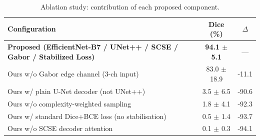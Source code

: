 \begin{table}[t]
\centering
\caption{Ablation study: contribution of each proposed component.}
\label{tab:ablation}
\begin{tabular}{lcc}
\toprule
Configuration & Dice (\%) & $\Delta$ \\
\midrule
\textbf{Proposed (EfficientNet-B7 / UNet++ / SCSE / Gabor / Stabilized Loss)} & \textbf{94.1 $\pm$ 5.1} & --- \\
Ours w/o Gabor edge channel (3-ch input) & 83.0 $\pm$ 18.9 & -11.1 \\
Ours w/ plain U-Net decoder (not UNet++) & 3.5 $\pm$ 6.5 & -90.6 \\
Ours w/o complexity-weighted sampling & 1.8 $\pm$ 4.1 & -92.3 \\
Ours w/ standard Dice+BCE loss (no stabilisation) & 0.5 $\pm$ 1.4 & -93.7 \\
Ours w/o SCSE decoder attention & 0.1 $\pm$ 0.3 & -94.1 \\
\bottomrule
\end{tabular}
\end{table}